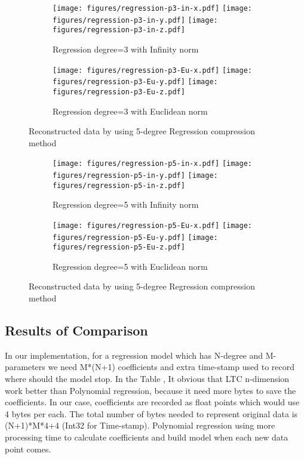 \begin{figure*}
\centering
\begin{subfigure}{\columnwidth}
\centering
\texttt{[image: figures/regression-p3-in-x.pdf]}
\texttt{[image: figures/regression-p3-in-y.pdf]}
\texttt{[image: figures/regression-p3-in-z.pdf]}
\caption{Regression degree=3 with Infinity norm}
\end{subfigure}

\centering
\begin{subfigure}{\columnwidth}
\centering
\texttt{[image: figures/regression-p3-Eu-x.pdf]}
\texttt{[image: figures/regression-p3-Eu-y.pdf]}
\texttt{[image: figures/regression-p3-Eu-z.pdf]}
\caption{Regression degree=3 with Euclidean norm}
\end{subfigure}

\caption{Reconstructed data by using 5-degree Regression compression method}
\label{fig:poly-regression-3-degree}
\end{figure*}


\begin{figure*}
\centering
\begin{subfigure}{\columnwidth}
\centering
\texttt{[image: figures/regression-p5-in-x.pdf]}
\texttt{[image: figures/regression-p5-in-y.pdf]}
\texttt{[image: figures/regression-p5-in-z.pdf]}
\caption{Regression degree=5 with Infinity norm}
\end{subfigure}

\centering
\begin{subfigure}{\columnwidth}
\centering
\texttt{[image: figures/regression-p5-Eu-x.pdf]}
\texttt{[image: figures/regression-p5-Eu-y.pdf]}
\texttt{[image: figures/regression-p5-Eu-z.pdf]}
\caption{Regression degree=5 with Euclidean norm}
\end{subfigure}

\caption{Reconstructed data by using 5-degree Regression compression method}
\label{fig:poly-regression-5-degree}
\end{figure*}

\subsection{Results of Comparison}
In our implementation, for a regression model which has N-degree and
M-parameters we need M*(N+1) coefficients and extra time-stamp used to record
where should the model stop. In the Table , It obvious that LTC n-dimension work
better than Polynomial regression, because it need more bytes to save the
coefficients. In our case, coefficients are recorded as float points which would
use 4 bytes per each. The total number of bytes needed to represent original
data is (N+1)*M*4+4 (Int32 for Time-stamp). Polynomial regression using more
processing time to calculate coefficients and build model when each new data
point comes. 

